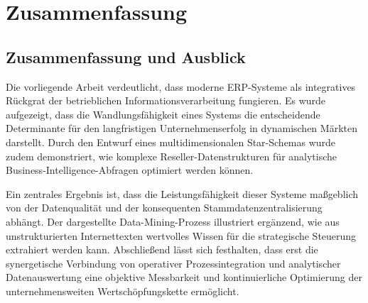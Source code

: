 
\chapter*{Zusammenfassung}
\label{chap:Zusammenfassung}
\thispagestyle{fancy}
\section*{Zusammenfassung und Ausblick} 
Die vorliegende Arbeit verdeutlicht, dass moderne \acs{ERP}-Systeme als integratives Rückgrat der betrieblichen Informationsverarbeitung fungieren. Es wurde aufgezeigt, dass die Wandlungsfähigkeit eines Systems die entscheidende Determinante für den langfristigen Unternehmenserfolg in dynamischen Märkten darstellt. Durch den Entwurf eines multidimensionalen Star-Schemas wurde zudem demonstriert, wie komplexe Reseller-Datenstrukturen für analytische Business-Intelligence-Abfragen optimiert werden können. \par\par Ein zentrales Ergebnis ist, dass die Leistungsfähigkeit dieser Systeme maßgeblich von der Datenqualität und der konsequenten Stammdatenzentralisierung abhängt. Der dargestellte Data-Mining-Prozess illustriert ergänzend, wie aus unstrukturierten Internettexten wertvolles Wissen für die strategische Steuerung extrahiert werden kann. Abschließend lässt sich festhalten, dass erst die synergetische Verbindung von operativer Prozessintegration und analytischer Datenauswertung eine objektive Messbarkeit und kontinuierliche Optimierung der unternehmensweiten Wertschöpfungskette ermöglicht.

